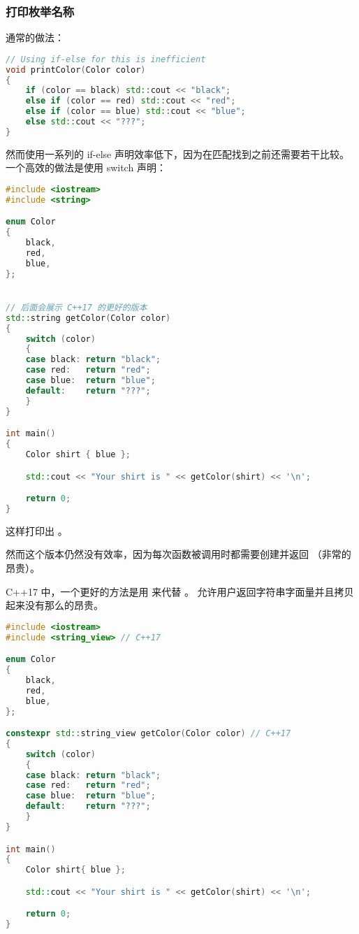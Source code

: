 \documentclass[../../LearnCpp.tex]{subfiles}
\begin{document}
\subsubsection*{打印枚举名称}

通常的做法：

\begin{lstlisting}[language=C++]
// Using if-else for this is inefficient
void printColor(Color color)
{
    if (color == black) std::cout << "black";
    else if (color == red) std::cout << "red";
    else if (color == blue) std::cout << "blue";
    else std::cout << "???";
}
\end{lstlisting}

然而使用一系列的 if-else 声明效率低下，因为在匹配找到之前还需要若干比较。
一个高效的做法是使用 switch 声明：

\begin{lstlisting}[language=C++]
#include <iostream>
#include <string>

enum Color
{
    black,
    red,
    blue,
};


// 后面会展示 C++17 的更好的版本
std::string getColor(Color color)
{
    switch (color)
    {
    case black: return "black";
    case red:   return "red";
    case blue:  return "blue";
    default:    return "???";
    }
}

int main()
{
    Color shirt { blue };

    std::cout << "Your shirt is " << getColor(shirt) << '\n';

    return 0;
}
\end{lstlisting}

这样打印出 。

然而这个版本仍然没有效率，因为每次函数被调用时都需要创建并返回 （非常的昂贵）。

C++17 中，一个更好的方法是用  来代替 。
 允许用户返回字符串字面量并且拷贝起来没有那么的昂贵。

\begin{lstlisting}[language=C++]
#include <iostream>
#include <string_view> // C++17

enum Color
{
    black,
    red,
    blue,
};

constexpr std::string_view getColor(Color color) // C++17
{
    switch (color)
    {
    case black: return "black";
    case red:   return "red";
    case blue:  return "blue";
    default:    return "???";
    }
}

int main()
{
    Color shirt{ blue };

    std::cout << "Your shirt is " << getColor(shirt) << '\n';

    return 0;
}
\end{lstlisting}
\end{document}
